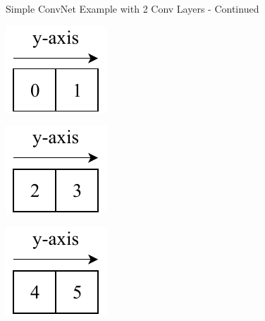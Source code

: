 \documentclass{beamer}
\begin{document}
		\begin{frame}{Simple ConvNet Example with 2 Conv Layers - Continued}
				\begin{center}
					\includegraphics[height=0.2\textheight]{input1}
				\end{center}
				\begin{center}
					\includegraphics[height=0.2\textheight]{input2}
				\end{center}
				\begin{center}
						\includegraphics[height=0.2\textheight]{input3}
				\end{center}
		\end{frame}
\end{document}
